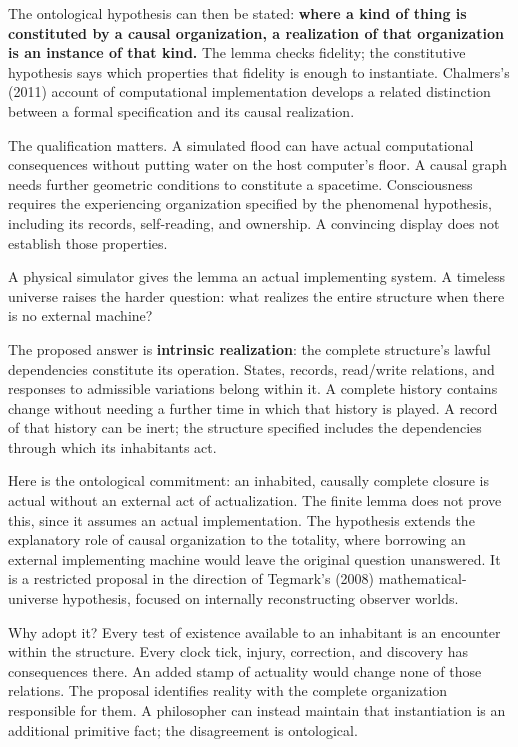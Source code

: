 \documentclass[
  11pt,
]{article}
\begin{document}
The ontological hypothesis can then be stated: \textbf{where a kind of
thing is constituted by a causal organization, a realization of that
organization is an instance of that kind.} The lemma checks fidelity;
the constitutive hypothesis says which properties that fidelity is
enough to instantiate. Chalmers's (2011) account of computational
implementation develops a related distinction between a formal
specification and its causal realization.

The qualification matters. A simulated flood can have actual
computational consequences without putting water on the host computer's
floor. A causal graph needs further geometric conditions to constitute a
spacetime. Consciousness requires the experiencing organization
specified by the phenomenal hypothesis, including its records,
self-reading, and ownership. A convincing display does not establish
those properties.

A physical simulator gives the lemma an actual implementing system. A
timeless universe raises the harder question: what realizes the entire
structure when there is no external machine?

The proposed answer is \textbf{intrinsic realization}: the complete
structure's lawful dependencies constitute its operation. States,
records, read/write relations, and responses to admissible variations
belong within it. A complete history contains change without needing a
further time in which that history is played. A record of that history
can be inert; the structure specified includes the dependencies through
which its inhabitants act.

Here is the ontological commitment: an inhabited, causally complete
closure is actual without an external act of actualization. The finite
lemma does not prove this, since it assumes an actual implementation.
The hypothesis extends the explanatory role of causal organization to
the totality, where borrowing an external implementing machine would
leave the original question unanswered. It is a restricted proposal in
the direction of Tegmark's (2008) mathematical-universe hypothesis,
focused on internally reconstructing observer worlds.

Why adopt it? Every test of existence available to an inhabitant is
an encounter within the structure. Every clock tick, injury,
correction, and discovery has consequences there. An added stamp of
actuality would change none of those relations. The proposal identifies
reality with the complete organization responsible for them. A
philosopher can instead maintain that instantiation is an additional
primitive fact; the disagreement is ontological.
\end{document}
